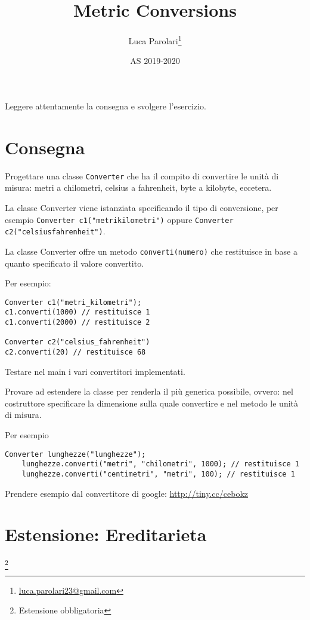 \documentclass[addpoints,12pt,answers]{exam}
\author{Luca Parolari\footnote{\href{mailto:luca.parolari23@gmail.com}{luca.parolari23@gmail.com}}}
\begin{document}
\title{Metric Conversions}
\date{AS 2019-2020}

\maketitle

Leggere attentamente la consegna e svolgere l'esercizio.

\section{Consegna}

Progettare una classe \texttt{Converter} che ha il compito di convertire
le unità di misura: metri a chilometri, celsius a fahrenheit, byte a
kilobyte, eccetera.

La classe Converter viene istanziata specificando il tipo di conversione,
per esempio \texttt{Converter c1("metri\textunderscore kilometri")} oppure
\texttt{Converter c2("celsius\textunderscore fahrenheit")}.

La classe Converter offre un metodo \texttt{converti(numero)} che restituisce
in base a quanto specificato il valore convertito.

Per esempio:
\begin{lstlisting}[style=mycpp]
Converter c1("metri_kilometri");
c1.converti(1000) // restituisce 1
c1.converti(2000) // restituisce 2

Converter c2("celsius_fahrenheit")
c2.converti(20) // restituisce 68
\end{lstlisting}

Testare nel main i vari convertitori implementati.

Provare ad estendere la classe per renderla il più generica possibile,
ovvero: nel costruttore specificare la dimensione sulla quale convertire
e nel metodo le unità di misura.

Per esempio
\begin{lstlisting}[style=mycpp]
    Converter lunghezze("lunghezze");
    lunghezze.converti("metri", "chilometri", 1000); // restituisce 1
    lunghezze.converti("centimetri", "metri", 100); // restituisce 1
    \end{lstlisting}

Prendere esempio dal convertitore di google: \href{http://tiny.cc/cebokz}{http://tiny.cc/cebokz}

\pagebreak

\section{Estensione: Ereditarieta}
\footnote{Estensione obbligatoria}
\end{document}
